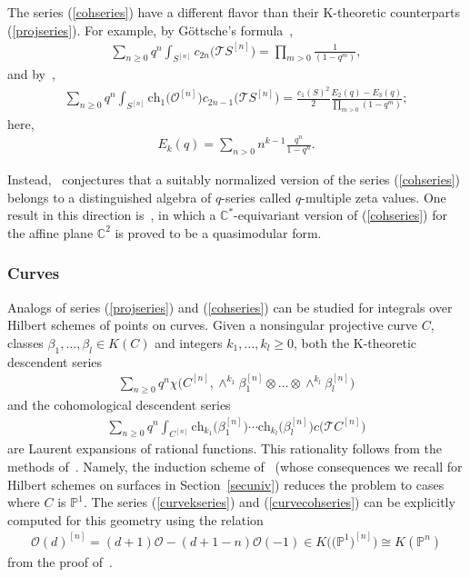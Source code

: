 \documentclass[10pt,a4paper]{amsart}
\numberwithin{equation}{section}
\def\O{\mathcal{O}}
\newcommand{\ch}{\mathrm{ch}}
\def\C{\mathbb C}
\def\P{\mathbb P}
\begin{document}
The series (\ref{cohseries}) have a different flavor than their K-theoretic counterparts (\ref{projseries}). For example, by G\"{o}ttsche's formula~\cite[Theorem~0.1]{G},
\begin{gather*}
\sum_{n\geq 0} q^{n} \int_{S^{[n]}} c_{2n}\big(\mathcal{T}S^{[n]}\big)=\prod_{m>0} \frac{1}{(1-q^m)},
\end{gather*}
and by~\cite[Corollary 3]{CO},
\begin{gather*}
\sum_{n\geq 0}q^{n} \int_{S^{[n]}} \ch_{1}\big(\mathcal{O}^{[n]}\big)c_{2n-1}\big(\mathcal{T}S^{[n]}\big)=\frac{c_1(S)^2}{2} \frac{E_2(q)-E_3(q)}{\prod_{m>0}(1-q^m) };
\end{gather*}
here,
\begin{gather*}
E_k(q)=\sum_{n> 0} n^{k-1} \frac{q^n}{1-q^{n}}.
\end{gather*}

Instead,~\cite[Conjecture 2]{O} conjectures that a suitably normalized version of the series (\ref{cohseries}) belongs to a distinguished algebra of $q$-series called $q$-multiple zeta values. One result in this direction is~\cite[Theorem~2]{C}, in which a $\C^*$-equivariant version of (\ref{cohseries}) for the affine plane $\C^2$ is proved to be a quasimodular form.


\subsubsection{Curves}

Analogs of series (\ref{projseries}) and (\ref{cohseries}) can be studied for integrals over Hilbert schemes of points on curves. Given a nonsingular projective curve $C$, classes $\beta_1,\dots,\beta_l\in K(C)$ and integers $k_1,\dots,k_l\geq 0$, both the K-theoretic descendent series \begin{align}\label{curvekseries}
\sum_{n\geq 0} q^n \chi\big({C^{[n]}}, \wedge^{k_1}\beta_1^{[n]}\otimes \dots \otimes\wedge^{k_l}\beta_l^{[n]}\big)
\end{align}
and the cohomological descendent series
\begin{align}\label{curvecohseries}
\sum_{n\geq 0} q^n \int_{C^{[n]}} \ch_{k_1}\big(\beta_1^{[n]}\big)\cdots \ch_{k_l}\big(\beta_l^{[n]}\big) c\big(\mathcal{T}C^{[n]}\big)
\end{align}
are Laurent expansions of rational functions. This rationality follows from the methods of~\cite[Section~2.3]{OP}. Namely, the induction scheme of~\cite{EGL} (whose consequences we recall for Hilbert schemes on surfaces in Section~\ref{secuniv}) reduces the problem to cases where $C$ is $\P^1$. The series (\ref{curvekseries}) and (\ref{curvecohseries}) can be explicitly computed for this geometry using the relation
\begin{gather*}
\O(d)^{[n]}=(d+1)\O-(d+1-n)\O(-1)\in K\big(\big(\P^1\big)^{[n]}\big)\cong K(\P^n)
\end{gather*}
from the proof of~\cite[Theorem~2]{MOP2}.
\end{document}
